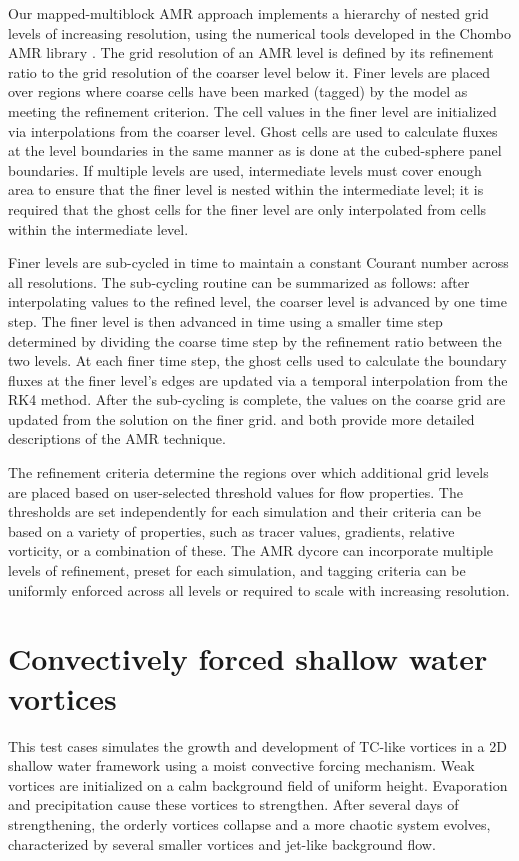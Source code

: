 \documentclass{ametsoc}
\begin{document}
  Our mapped-multiblock AMR approach implements a hierarchy of 
  nested grid levels of increasing resolution, using the numerical tools 
  developed in the Chombo AMR library \citep{Adams:2015gd}. 
  The grid resolution of an AMR level is defined by its refinement ratio 
  to the grid resolution of the coarser level below it. Finer levels are 
  placed over regions where coarse cells have been marked (tagged) 
  by the model as meeting the refinement criterion. The cell values in 
  the finer level are initialized via interpolations from the coarser level. 
  Ghost cells are used to calculate fluxes at the level boundaries in the 
  same manner as is done at the cubed-sphere panel boundaries. If 
  multiple levels are used, intermediate levels must cover enough area 
  to ensure that the finer level is nested within the intermediate level; it 
  is required that the ghost cells for the finer level are only interpolated 
  from cells within the intermediate level.  
  
  Finer levels are sub-cycled in time to maintain a constant Courant 
  number across all resolutions. The sub-cycling routine can be 
  summarized as follows: after interpolating values to the refined 
  level, the coarser level is advanced by one time step. The finer level 
  is then advanced in time using a smaller time step determined by 
  dividing the coarse time step by the refinement ratio between the two 
  levels.  At each finer time step, the ghost cells used to calculate the 
  boundary fluxes at the finer level's edges are updated via a temporal 
  interpolation from the RK4 method. After the sub-cycling is complete, 
  the values on the coarse grid are updated from the solution on the 
  finer grid.  \cite{mccorquodale2015adaptive} and \cite{ferguson2016analyzing} 
  both provide more detailed descriptions of the AMR technique. 
  
  The refinement criteria determine the regions over which additional 
  grid levels are placed based on user-selected threshold values for 
  flow properties.  The thresholds are set independently for each 
  simulation and their criteria can be based on a variety of properties, 
  such as tracer values, gradients, relative vorticity, or a combination of 
  these. The AMR dycore can incorporate multiple levels of refinement, 
  preset for each simulation, and tagging criteria can be uniformly 
  enforced across all levels or required to scale with increasing resolution.
 
\section{Convectively forced shallow water vortices}
\label{sec:forcedvort} 
  This test cases simulates the growth and development of TC-like 
  vortices in a 2D shallow water framework using a moist convective forcing 
  mechanism. Weak vortices are initialized on a calm background field 
  of uniform height. Evaporation and precipitation cause these vortices to strengthen. 
  After several days of strengthening, the orderly vortices collapse and a more chaotic 
  system evolves, characterized by several smaller vortices and jet-like background flow. 
\end{document}
